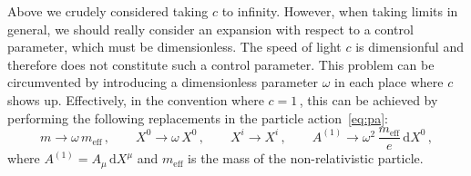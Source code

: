 \documentclass[11pt]{article}
\newcommand{\be}{\begin{equation}}
\newcommand{\ee}{\end{equation}}
\newcommand{\dd}{\mathrm{d}}
\begin{document}
Above we crudely considered taking $c$ to infinity.
However, when taking limits in general, we should really consider an expansion with respect to a control parameter, which must be dimensionless. The speed of light $c$ is dimensionful and therefore does not constitute such a control parameter. This problem can be circumvented by introducing a dimensionless parameter $\omega$ in each place where $c$ shows up. Effectively, in the convention where $c = 1$\,, this can be achieved by performing the following replacements in the particle action~\eqref{eq:pa}:
%
\be \label{eq:xzxiao}
    m \rightarrow \omega \, m^{}_\text{eff}\,,
        \qquad%
    X^0 \rightarrow \omega \, X^0\,,
        \qquad%
    X^i \rightarrow X^i\,,
        \qquad%
    A^{(1)} \rightarrow \omega^2 \,\frac{m_\text{eff}}{e} \, \dd X^0 \,,
\ee
%
where $A^{(1)} = A_\mu \, \dd X^\mu$ and $m_\text{eff}$ is the mass of the non-relativistic particle. 
\end{document}
